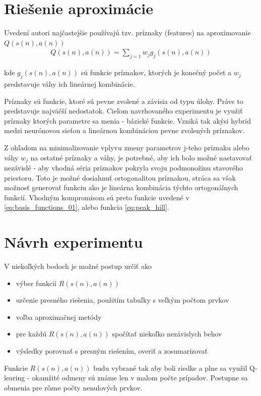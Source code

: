 \section {Riešenie aproximácie}

Uvedení autori najčastejšie používajú tzv. príznaky (features) na aproximovanie $Q(s(n), a(n))$
\begin{align}
Q(s(n), a(n)) = \sum\limits_{j=1} w_j g_j(s(n), a(n))
\label{eq:features_func}
\end{align}

kde $g_j(s(n), a(n))$ sú funkcie príznakov, ktorých je konečný počet a
$w_j$ predstavuje váhy ich lineárnej kombinácie.

Príznaky sú funkcie, ktoré sú pevne zvolené a závisia od typu úlohy. Práve to predstavuje najväčší
nedostatok. Cieľom navrhovaného experimentu je využiť príznaky ktorých parametre
sa menia - bázické funkcie. Vzniká tak akýsi hybrid medzi neurónovou sieťou a lineárnou kombináciou
pevne zvolených príznakov.

Z ohľadom na minimalizovanie vplyvu zmeny parametrov j-teho príznaku alebo váhy $w_j$
na ostatné príznaky a váhy, je potrebné, aby ich bolo možné nastavovať nezávislé -
aby vhodná séria príznakov pokryla svoju podmonožinu stavového priestoru. Toto
je možné dosiahnuť ortogonalitou príznakou, stráca sa však možnosť generovať funkciu
ako je lineárna kombinácia týchto ortogonálnych funkcií. Vhodným kompromisom sú
preto funkcie uvedené v \ref{eq:basis_functions_01}, alebo funkcia \ref{eq:peak_hill}.


\section {Návrh experimentu}

V niekoľkých bodoch je možné postup určiť ako

\begin{itemize}
\item výber funkcií $R(s(n), a(n))$
\item určenie presného riešenia, použitím tabuľky s veľkým počtom prvkov
\item voľba aproximačnej metódy
\item pre každú $R(s(n), a(n))$ spočítať niekoľko nezávislych behov
\item výsledky porovnať s presným riešením, overiť a zosumarizovať
\end{itemize}

Funkcie $R(s(n), a(n))$ budu vybrané tak aby boli riedke a plne sa využil Q-learing -
okamžité odmeny sú známe len v malom počte prípadov.
Postupne sa obmenia pre rôzne počty nenulových prvkov.

